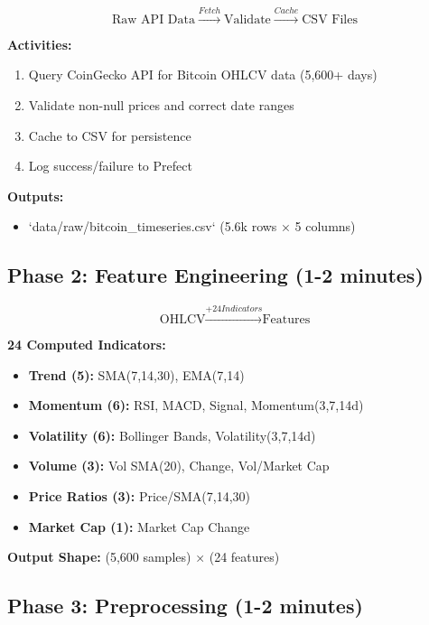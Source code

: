 \begin{equation}
\text{Raw API Data} \xrightarrow{Fetch} \text{Validate} \xrightarrow{Cache} \text{CSV Files}
\end{equation}

\textbf{Activities:}
\begin{enumerate}
    \item Query CoinGecko API for Bitcoin OHLCV data (5,600+ days)
    \item Validate non-null prices and correct date ranges
    \item Cache to CSV for persistence
    \item Log success/failure to Prefect
\end{enumerate}

\textbf{Outputs:}
\begin{itemize}
    \item `data/raw/bitcoin_timeseries.csv` (5.6k rows × 5 columns)
\end{itemize}

\subsection{Phase 2: Feature Engineering (1-2 minutes)}

\begin{equation}
\text{OHLCV} \xrightarrow{+24 Indicators} \text{Features}
\end{equation}

\textbf{24 Computed Indicators:}
\begin{itemize}
    \item \textbf{Trend (5):} SMA(7,14,30), EMA(7,14)
    \item \textbf{Momentum (6):} RSI, MACD, Signal, Momentum(3,7,14d)
    \item \textbf{Volatility (6):} Bollinger Bands, Volatility(3,7,14d)
    \item \textbf{Volume (3):} Vol SMA(20), Change, Vol/Market Cap
    \item \textbf{Price Ratios (3):} Price/SMA(7,14,30)
    \item \textbf{Market Cap (1):} Market Cap Change
\end{itemize}

\textbf{Output Shape:} (5,600 samples) × (24 features)

\subsection{Phase 3: Preprocessing (1-2 minutes)}


